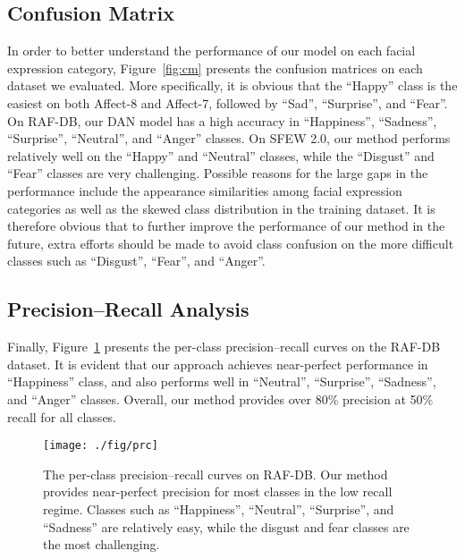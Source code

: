 \documentclass{article}
\begin{document}
\subsection{Confusion Matrix}
In order to better understand the performance of our model on each facial expression category, Figure~\ref{fig:cm} presents the confusion matrices on each dataset we evaluated. More specifically, it is obvious that the ``Happy'' class is the easiest on both Affect-8 and Affect-7, followed by ``Sad'', ``Surprise'', and ``Fear''. On RAF-DB, our DAN model has a high accuracy in ``Happiness'', ``Sadness'', ``Surprise'', ``Neutral'', and ``Anger'' classes. On SFEW 2.0, our method performs relatively well on the ``Happy'' and ``Neutral'' classes, while the ``Disgust'' and ``Fear'' classes are very challenging. Possible reasons for the large gaps in the performance include the appearance similarities among facial expression categories as well as the skewed class distribution in the training dataset. It is therefore obvious that to further improve the performance of our method in the future, extra efforts should be made to avoid class confusion on the more difficult classes such as ``Disgust'', ``Fear'', and ``Anger''.

\subsection{Precision--Recall Analysis}
Finally, Figure~\ref{fig:prc} presents the per-class precision--recall curves on the RAF-DB dataset. It is evident that our approach achieves near-perfect performance in ``Happiness'' class, and also performs well in ``Neutral'', ``Surprise'', ``Sadness'', and ``Anger'' classes. Overall, our method provides over 80\% precision at 50\% recall for all classes.


\begin{figure}[]
\centering
{\texttt{[image: ./fig/prc]}}
\caption{The per-class precision--recall curves on RAF-DB. Our method provides near-perfect precision for most classes in the low recall regime. Classes such as ``Happiness'', ``Neutral'', ``Surprise'', and ``Sadness'' are relatively easy, while the disgust and fear classes are the most challenging.}
\label{fig:prc}

\end{figure}
\end{document}
